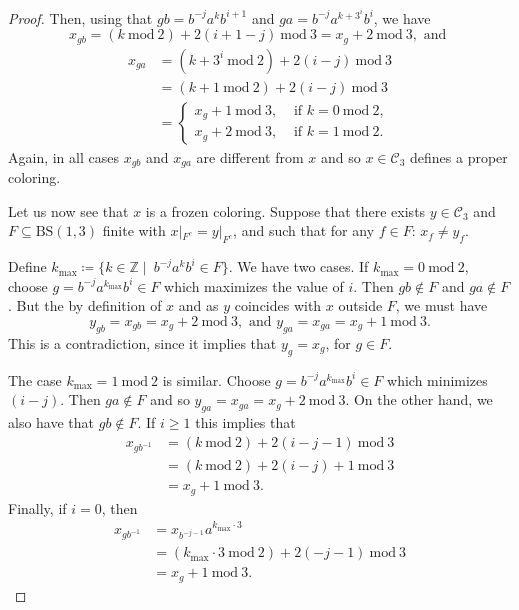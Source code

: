 \documentclass[cupthm,crop,info]{CUP-JNL-ETS}%
\theoremstyle{cupplain}
\theoremstyle{cupdefinition}
\theoremstyle{cupremark}
\theoremstyle{cupproof}
\newtheorem{proof}{Proof}
\numberwithin{equation}{section}
\begin{document}
\begin{proof}
	
	Then, using that $gb=b^{-j}a^kb^{i+1}$ and $ga=b^{-j}a^{k+3^i}b^{i}$, we have 
	\begin{equation*}
x_{gb}= (k\ \mathrm{mod}\ 2)+2(i+1-j)\ \mathrm{mod}\ 3=x_{g}+2\  \mathrm{mod} \ 3, \text{ and }
	\end{equation*}
\begin{align*}
x_{ga}&=(k+3^{i}\ \mathrm{mod} \ 2)+ 2(i-j) \ \mathrm{mod}\ 3 \\
&=(k+1\ \mathrm{mod} \ 2)+ 2(i-j) \ \mathrm{mod}\ 3\\
&=\left\{\begin{aligned}
x_{g}+1 \ \mathrm{mod}\ 3, &\text{ if }k=0\ \mathrm{mod}\ 2, \\
x_{g}+2 \ \mathrm{mod}\ 3, &\text{ if }k=1\ \mathrm{mod}\ 2.
\end{aligned} \right.
\end{align*}
	Again, in all cases $x_{gb}$ and $x_{ga}$ are different from $x$ and so $x\in \mathcal{C}_3$ defines a proper coloring.
	
	Let us now see that $x$ is a frozen coloring. Suppose that there exists $y\in \mathcal{C}_3$ and $F\subseteq \mathrm{BS}(1,3)$ finite with $x|_{F^{c}}=y|_{F^{c}}$, and such that for any $f\in F$: $x_f\neq y_f$.
	
	Define $k_{\mathrm{max}}\coloneqq\{ k\in \mathbb{Z}\mid \ b^{-j}a^kb^i\in F \}$. We have two cases. If $k_\mathrm{max}=0\ \mathrm{mod}\ 2$, choose $g=b^{-j}a^{k_{\mathrm{max}}}b^i\in F$ which maximizes the value of $i$. Then $gb\notin F$ and $ga\notin F$. But the by definition of $x$ and as $y$ coincides with $x$ outside $F$, we must have
	\begin{equation*}
	y_{gb}=x_{gb}=x_{g}+2\ \mathrm{mod}\ 3, \text{ and  } 
	y_{ga}=x_{ga}=x_{g}+1\ \mathrm{mod}\ 3.
	\end{equation*}
	This is a contradiction, since it implies that $y_g=x_g$, for $g\in F$.
	
	
	The case $k_{\mathrm{max}}=1\ \mathrm{mod}\ 2$ is similar. Choose $g=b^{-j}a^{k_\mathrm{max}}b^{i}\in F$ which minimizes $(i-j)$. Then $ga\not \in F$ and so $y_{ga}=x_{ga}=x_{g}+2\ \mathrm{mod}\ 3$. On the other hand, we also have that $gb\not \in F$.
	If $i\ge 1$ this implies that
	\begin{align*}
	x_{gb^{-1}}&=(k\ \mathrm{mod\ 2})+2(i-j-1)\ \mathrm{mod}\ 3\\
	&=(k\ \mathrm{mod\  2})+2(i-j)+1\ \mathrm{mod}\ 3\\
	&=x_g+1\ \mathrm{mod}\ 3.
	\end{align*}
	Finally, if $i=0$, then 
	\begin{align*}
	x_{gb^{-1}}&=x_{b^{-j-1}}a^{k_{\mathrm{max}}\cdot 3}\\
	&=(k_{\mathrm{max}}\cdot 3 \ \mathrm{mod}\ 2)+2(-j-1)\ \mathrm{mod}\ 3\\
	&=x_g+1\ \mathrm{mod}\ 3.
	\end{align*}
	

\end{proof}
\end{document}
